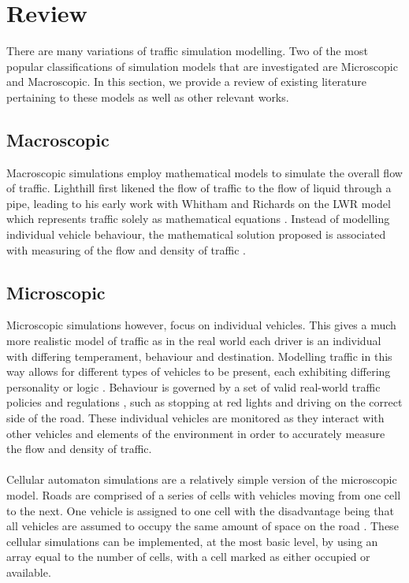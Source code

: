 \section{Review}

There are many variations of traffic simulation modelling. Two of the most popular classifications of simulation models that are investigated are Microscopic and Macroscopic. In this section, we provide a review of existing literature pertaining to these models as well as other relevant works. 

\subsection*{Macroscopic}
Macroscopic simulations employ mathematical models to simulate the overall flow of traffic. Lighthill first likened the flow of traffic to the flow of liquid through a pipe, leading to his early work with Whitham and Richards on the LWR model which represents traffic solely as mathematical equations \cite{Lighthill1955Kinetic,Treiber2013Flow,6042479}. Instead of modelling individual vehicle behaviour, the mathematical solution proposed is associated with measuring of the flow and density of traffic \cite{boxill2000evaluation,ehlert2001reactive}. 

\subsection*{Microscopic}
Microscopic simulations however, focus on individual vehicles. This gives a much more realistic model of traffic as in the real world each driver is an individual with differing temperament, behaviour and destination. Modelling traffic in this way allows for different types of vehicles to be present, each exhibiting differing personality or logic \cite{Owen:2000:STS:510378.510542}. Behaviour is governed by a set of valid real-world traffic policies and regulations \cite{Schulze:1997:UTS:268437.268764}, such as stopping at red lights and driving on the correct side of the road.
These individual vehicles are monitored as they interact with other vehicles and elements of the environment in order to accurately measure the flow and density of traffic.

\paragraph{}
Cellular automaton simulations are a relatively simple version of the microscopic model. Roads are comprised of a series of cells with vehicles moving from one cell to the next. One vehicle is assigned to one cell with the disadvantage being that all vehicles are assumed to occupy the same amount of space on the road \cite{Namekawa2005CellAutomaton,6737859}. These cellular simulations can be implemented, at the most basic level, by using an array equal to the number of cells, with a cell marked as either occupied or available.

